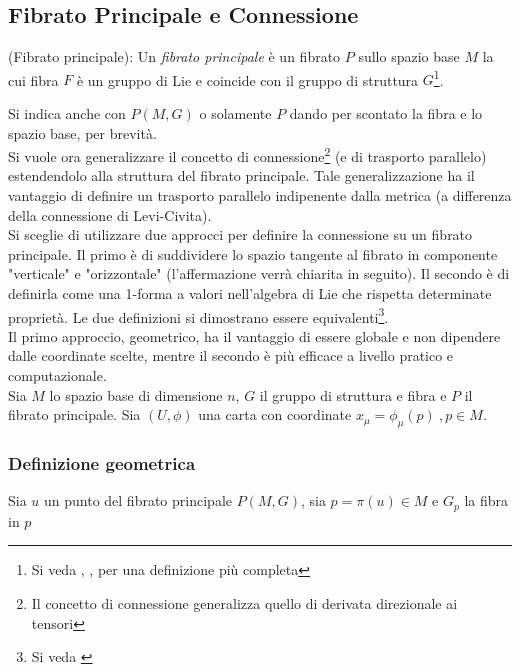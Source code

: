 \subsection{Fibrato Principale e Connessione}
\begin{definition}{(Fibrato principale)}\label{def:principalbundle}:
   Un \emph{fibrato principale} è un fibrato $P$ sullo spazio base $M$ la cui
   fibra $F$ è un gruppo di Lie e coincide con il gruppo di struttura
   $G$\footnote{Si veda \cite{nakahara}, \cite{shnir}, \cite{eguchi}
   per una definizione più completa}.
\end{definition}
Si indica anche con $P(M,G)$ o solamente $P$ dando per scontato la fibra
e lo spazio base, per brevità.\\

Si vuole ora generalizzare il concetto di connessione\footnote{Il concetto di
connessione generalizza quello di derivata direzionale ai tensori}
(e di trasporto parallelo) estendendolo alla struttura del fibrato principale.
Tale generalizzazione ha il vantaggio di definire un trasporto parallelo
indipenente dalla metrica (a differenza della connessione di Levi-Civita). \\

Si sceglie di utilizzare due approcci per definire la connessione su un fibrato
principale. Il primo è di suddividere lo spazio tangente al fibrato in componente
"verticale" e "orizzontale" (l'affermazione verrà chiarita in seguito).
Il secondo è di definirla come una 1-forma a valori nell'algebra di Lie che
rispetta determinate proprietà. Le due definizioni si dimostrano essere
equivalenti\footnote{Si veda \cite{nakahara}}.\\
Il primo approccio, geometrico, ha il vantaggio di essere globale e non dipendere
dalle coordinate scelte, mentre il secondo è più efficace a livello pratico e
computazionale.\\

Sia $M$ lo spazio base di dimensione $n$, $G$ il gruppo di struttura e fibra e
$P$ il fibrato principale.
Sia $(U,\phi)$ una carta con coordinate $x_\mu = \phi_\mu(p) \:,p \in M$. \\

\subsubsection{Definizione geometrica}
Sia $u$ un punto del fibrato principale $P(M,G)$, sia $p = \pi(u) \in M$ e
$G_p$ la fibra in $p$\\

